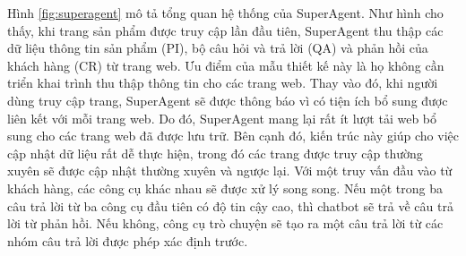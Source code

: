 Hình \ref{fig:superagent} mô tả tổng quan hệ thống của SuperAgent. Như hình cho thấy, khi trang sản phẩm được truy cập lần đầu tiên, SuperAgent thu thập các dữ liệu thông tin sản phẩm (PI), bộ câu hỏi và trả lời (QA) và phản hồi của khách hàng (CR) từ trang web. Ưu điểm của mẫu thiết kế này là họ không cần triển khai trình thu thập thông tin cho các trang web. Thay vào đó, khi người dùng truy cập trang, SuperAgent sẽ được thông báo vì có tiện ích bổ sung được liên kết với mỗi trang web. Do đó, SuperAgent mang lại rất ít lượt tải web bổ sung cho các trang web đã được lưu trữ. Bên cạnh đó, kiến trúc này giúp cho việc cập nhật dữ liệu rất dễ thực hiện, trong đó các trang được truy cập thường xuyên sẽ được cập nhật thường xuyên và ngược lại. Với một truy vấn đầu vào từ khách hàng, các công cụ khác nhau sẽ được xử lý song song. Nếu một trong ba câu trả lời từ ba công cụ đầu tiên có độ tin cậy cao, thì chatbot sẽ trả về câu trả lời từ phản hồi. Nếu không, công cụ trò chuyện sẽ tạo ra một câu trả lời từ các nhóm câu trả lời được phép xác định trước.

